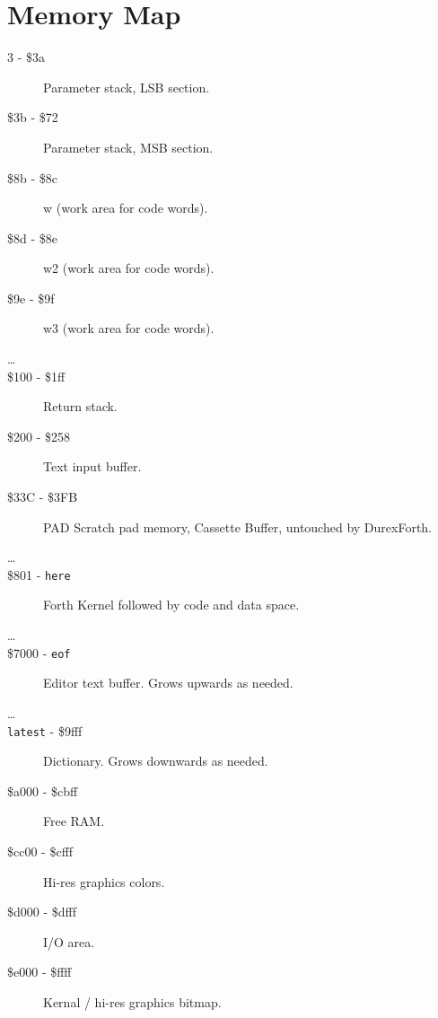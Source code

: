 \chapter{Memory Map}

\begin{description}
\item[3 - \$3a] Parameter stack, LSB section.
\item[\$3b - \$72] Parameter stack, MSB section.
\item[\$8b - \$8c] w (work area for code words).
\item[\$8d - \$8e] w2 (work area for code words).
\item[\$9e - \$9f] w3 (work area for code words).
\item[\ldots]
\item[\$100 - \$1ff] Return stack.
\item[\$200 - \$258] Text input buffer.
\item[\$33C - \$3FB] PAD Scratch pad memory, Cassette Buffer, untouched by DurexForth. 
\item[\ldots]
\item[\$801 - \texttt{here}] Forth Kernel followed by code and data space.
\item[\ldots]
\item[\$7000 - \texttt{eof}] Editor text buffer. Grows upwards as needed.
\item[\ldots]
\item[\texttt{latest} - \$9fff] Dictionary. Grows downwards as needed.
\item[\$a000 - \$cbff] Free RAM.
\item[\$cc00 - \$cfff] Hi-res graphics colors.
\item[\$d000 - \$dfff] I/O area. 
\item[\$e000 - \$ffff] Kernal / hi-res graphics bitmap.

\end{description}

